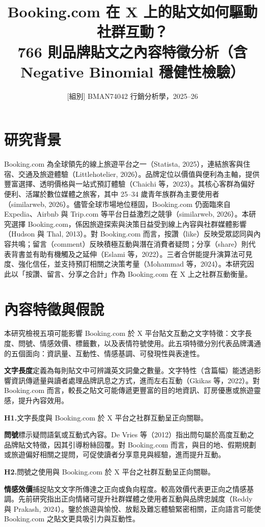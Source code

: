 \documentclass[12pt,a4paper]{ctexart}
\title{Booking.com 在 X 上的貼文如何驅動社群互動？\\[0.3em]
\large 766 則品牌貼文之內容特徵分析（含 Negative Binomial 穩健性檢驗）}
\author{[組別] \quad BMAN74042 行銷分析學，2025--26}
\date{}
\begin{document}
\maketitle

\section{研究背景}

Booking.com 為全球領先的線上旅遊平台之一（Statista, 2025），連結旅客與住宿、交通及旅遊體驗（Littlehotelier, 2026）。品牌定位以價值與便利為主軸，提供豐富選擇、透明價格與一站式預訂體驗（Chaichi 等，2023）。其核心客群為偏好便利、活躍於數位媒體之旅客，其中 25--34 歲青年族群為主要使用者（similarweb, 2026）。儘管全球市場地位穩固，Booking.com 仍面臨來自 Expedia、Airbnb 與 Trip.com 等平台日益激烈之競爭（similarweb, 2026）。本研究選擇 Booking.com，係因旅遊探索與決策日益受到線上內容與社群媒體影響（Hudson 與 Thal, 2013）。對 Booking.com 而言，按讚（like）反映受眾認同與內容共鳴；留言（comment）反映積極互動與潛在消費者疑問；分享（share）則代表背書並有助有機觸及之延伸（Eslami 等，2022）。三者合併能提升演算法可見度、強化信任，並支持預訂相關之決策考量（Mohammad 等，2024）。本研究因此以「按讚、留言、分享之合計」作為 Booking.com 在 X 上之社群互動衡量。

\section{內容特徵與假說}

本研究檢視五項可能影響 Booking.com 於 X 平台貼文互動之文字特徵：文字長度、問號、情感效價、標籤數，以及表情符號使用。此五項特徵分別代表品牌溝通的五個面向：資訊量、互動性、情感基調、可發現性與表達性。

\textbf{文字長度}定義為每則貼文中可辨識英文詞彙之數量。文字特性（含篇幅）能透過影響資訊傳遞量與讀者處理品牌訊息之方式，進而左右互動（Gkikas 等，2022）。對 Booking.com 而言，較長之貼文可能傳遞更豐富的目的地資訊、訂房優惠或旅遊靈感，提升內容效用。

\textbf{H1.}文字長度與 Booking.com 於 X 平台之社群互動呈正向關聯。

\textbf{問號}標示疑問語氣或互動式內容。De Vries 等（2012）指出問句屬於高度互動之品牌貼文特徵，因其引導粉絲回覆。對 Booking.com 而言，與目的地、假期規劃或旅遊偏好相關之提問，可促使讀者分享意見與經驗，進而提升互動。

\textbf{H2.}問號之使用與 Booking.com 於 X 平台之社群互動呈正向關聯。

\textbf{情感效價}捕捉貼文文字所傳達之正向或負向程度。較高效價代表更正向之情感基調。先前研究指出正向情緒可提升社群媒體之使用者互動與品牌忠誠度（Reddy 與 Prakash, 2024）。鑒於旅遊與愉悅、放鬆及難忘體驗緊密相關，正向語言可能使 Booking.com 之貼文更具吸引力與互動性。
\end{document}
